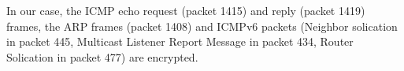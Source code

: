In our case, the ICMP echo request (packet 1415) and reply (packet 1419) frames, the ARP frames (packet 1408) and ICMPv6 packets (Neighbor solication in packet 445, Multicast Listener Report Message in packet 434, Router Solication in packet 477) are encrypted.
